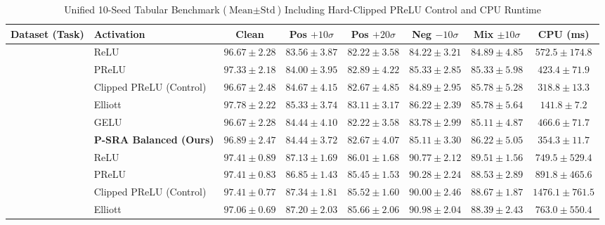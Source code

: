 \documentclass[conference]{IEEEtran}
\begin{document}
\begin{table}[t]
\centering
\caption{Unified 10-Seed Tabular Benchmark ($\text{Mean} \pm \text{Std}$) Including Hard-Clipped PReLU Control and CPU Runtime}
\label{tab:unified_tabular}
\begin{tabular}{llcccccc}
\toprule
\textbf{Dataset (Task)} & \textbf{Activation} & \textbf{Clean} & \textbf{Pos $+10\sigma$} & \textbf{Pos $+20\sigma$} & \textbf{Neg $-10\sigma$} & \textbf{Mix $\pm 10\sigma$} & \textbf{CPU (ms)} \\
\midrule
{} 
 & ReLU & $96.67 \pm 2.28$ & $83.56 \pm 3.87$ & $82.22 \pm 3.58$ & $84.22 \pm 3.21$ & $84.89 \pm 4.85$ & $572.5 \pm 174.8$ \\
 & PReLU & $97.33 \pm 2.18$ & $84.00 \pm 3.95$ & $82.89 \pm 4.22$ & $85.33 \pm 2.85$ & $85.33 \pm 5.98$ & $423.4 \pm 71.9$ \\
 & Clipped PReLU (Control) & $96.67 \pm 2.48$ & $84.67 \pm 4.15$ & $82.67 \pm 4.85$ & $84.89 \pm 2.95$ & $85.78 \pm 5.28$ & $318.8 \pm 13.3$ \\
 & Elliott & $\mathbf{97.78 \pm 2.22}$ & $\mathbf{85.33 \pm 3.74}$ & $\mathbf{83.11 \pm 3.17}$ & $\mathbf{86.22 \pm 2.39}$ & $85.78 \pm 5.64$ & $\mathbf{141.8 \pm 7.2}$ \\
 & GELU & $96.67 \pm 2.28$ & $84.44 \pm 4.10$ & $82.22 \pm 3.58$ & $83.78 \pm 2.99$ & $85.11 \pm 4.87$ & $466.6 \pm 71.7$ \\
 & \textbf{P-SRA Balanced (Ours)} & $96.89 \pm 2.47$ & $84.44 \pm 3.72$ & $82.67 \pm 4.07$ & $85.11 \pm 3.30$ & $\mathbf{86.22 \pm 5.05}$ & $354.3 \pm 11.7$ \\
\midrule
{} 
 & ReLU & $97.41 \pm 0.89$ & $87.13 \pm 1.69$ & $86.01 \pm 1.68$ & $90.77 \pm 2.12$ & $\mathbf{89.51 \pm 1.56}$ & $\mathbf{749.5 \pm 529.4}$ \\
 & PReLU & $97.41 \pm 0.83$ & $86.85 \pm 1.43$ & $85.45 \pm 1.53$ & $90.28 \pm 2.24$ & $88.53 \pm 2.89$ & $891.8 \pm 465.6$ \\
 & Clipped PReLU (Control) & $97.41 \pm 0.77$ & $87.34 \pm 1.81$ & $85.52 \pm 1.60$ & $90.00 \pm 2.46$ & $88.67 \pm 1.87$ & $1476.1 \pm 761.5$ \\
 & Elliott & $97.06 \pm 0.69$ & $87.20 \pm 2.03$ & $85.66 \pm 2.06$ & $\mathbf{90.98 \pm 2.04}$ & $88.39 \pm 2.43$ & $763.0 \pm 550.4$ \\

\end{tabular}
\end{table}
\end{document}
